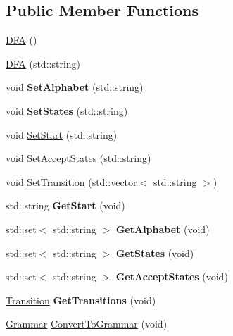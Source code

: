 \subsection*{Public Member Functions}
\begin{DoxyCompactItemize}
\item 
\hyperlink{classDFA_a0739bd751a325dd162604ed63fadea69}{D\+FA} ()
\item 
\hyperlink{classDFA_ae137a053d15ac73f44137e5a2f6718af}{D\+FA} (std\+::string)
\item 
\mbox{\label{classDFA_af87ac312c82e52a9200c40bc3ed88704}} 
void {\bfseries Set\+Alphabet} (std\+::string)
\item 
\mbox{\label{classDFA_a5200a0aebc86f7261f431293f139cc97}} 
void {\bfseries Set\+States} (std\+::string)
\item 
void \hyperlink{classDFA_a075c03019b2cf946ec7a7647821d506c}{Set\+Start} (std\+::string)
\item 
void \hyperlink{classDFA_a4cae060f040199523c337da6c078a3d6}{Set\+Accept\+States} (std\+::string)
\item 
void \hyperlink{classDFA_ac7986588e884c1fc76700f1059da221f}{Set\+Transition} (std\+::vector$<$ std\+::string $>$)
\item 
\mbox{\label{classDFA_ae381ce2c7fa105bab413a78009eb6a2d}} 
std\+::string {\bfseries Get\+Start} (void)
\item 
\mbox{\label{classDFA_a85978e02ffda330c1671c59529dfe787}} 
std\+::set$<$ std\+::string $>$ {\bfseries Get\+Alphabet} (void)
\item 
\mbox{\label{classDFA_a419338cef508a04d5fdaefa441ba2a66}} 
std\+::set$<$ std\+::string $>$ {\bfseries Get\+States} (void)
\item 
\mbox{\label{classDFA_a94eba1b9eb46f1c03b76d4c5a10033a4}} 
std\+::set$<$ std\+::string $>$ {\bfseries Get\+Accept\+States} (void)
\item 
\mbox{\label{classDFA_ac7b768a5e5d788adfb2b832493c7c534}} 
\hyperlink{classTransition}{Transition} {\bfseries Get\+Transitions} (void)
\item 
\hyperlink{classGrammar}{Grammar} \hyperlink{classDFA_a489f2637d08bf14a7336d2335bbe90e1}{Convert\+To\+Grammar} (void)
\end{DoxyCompactItemize}
